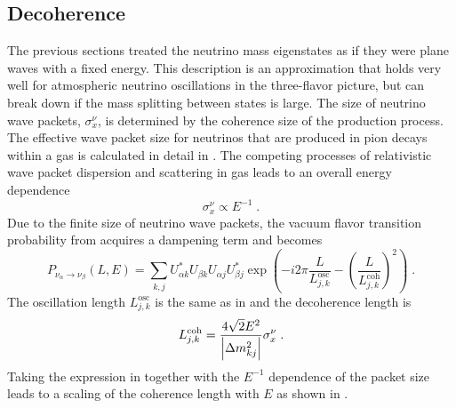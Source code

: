 \subsection{Decoherence}
\label{sec:decoherence}
The previous sections treated the neutrino mass eigenstates as if they were plane waves with a fixed energy.
This description is an approximation that holds very well for atmospheric neutrino oscillations in the three-flavor picture, but can break down if the mass splitting between states is large.
The size of neutrino wave packets, $\sigma_x^\nu$, is determined by the coherence size of the production process.
The effective wave packet size for neutrinos that are produced in pion decays within a gas is calculated in detail in .
The competing processes of relativistic wave packet dispersion and scattering in gas leads to an overall energy dependence
\begin{equation}
    \sigma_x^\nu \propto E^{-1}\;.
\end{equation}
Due to the finite size of neutrino wave packets, the vacuum flavor transition probability from  acquires a dampening term and becomes
\begin{equation}
    P_{\nu_\alpha \rightarrow \nu_\beta}(L,E) = \sum_{k,j}U^*_{\alpha k}U_{\beta k}U_{\alpha j}U_{\beta j}^* \exp(-i2\pi\frac{L}{L^\mathrm{osc}_{j,k}} - \left(\frac{L}{L^\mathrm{coh}_{j,k}}\right)^2)\;.
\end{equation}
The oscillation length $L^\mathrm{osc}_{j,k}$ is the same as in  and the decoherence length is
\begin{equation}
    L^\mathrm{coh}_{j,k} = \frac{4\sqrt{2}E^2}{\abs{\Delta m^2_{kj}}} \sigma_x^\nu\;.\label{eq:coh-length}
\end{equation}
Taking the expression in  together with the $E^{-1}$ dependence of the packet size leads to a scaling of the coherence length with $E$ as shown in .
